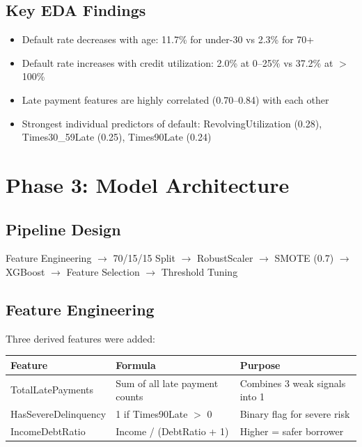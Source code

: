 \documentclass[12pt, a4paper]{article}
\begin{document}
\subsection{Key EDA Findings}

\begin{itemize}[noitemsep]
    \item Default rate decreases with age: 11.7\% for under-30 vs 2.3\% for 70+
    \item Default rate increases with credit utilization: 2.0\% at 0--25\% vs 37.2\% at $>$100\%
    \item Late payment features are highly correlated (0.70--0.84) with each other
    \item Strongest individual predictors of default: RevolvingUtilization (0.28), Times30\_59Late (0.25), Times90Late (0.24)
\end{itemize}




\section{Phase 3: Model Architecture}

\subsection{Pipeline Design}

Feature Engineering $\rightarrow$ 70/15/15 Split $\rightarrow$ RobustScaler $\rightarrow$ SMOTE (0.7) $\rightarrow$ XGBoost $\rightarrow$ Feature Selection $\rightarrow$ Threshold Tuning

\subsection{Feature Engineering}

Three derived features were added:

\begin{table}[H]
\centering
\begin{tabular}{lll}
\toprule
\textbf{Feature} & \textbf{Formula} & \textbf{Purpose} \\
\midrule
TotalLatePayments & Sum of all late payment counts & Combines 3 weak signals into 1 \\
HasSevereDelinquency & 1 if Times90Late $>$ 0 & Binary flag for severe risk \\
IncomeDebtRatio & Income / (DebtRatio + 1) & Higher = safer borrower \\
\bottomrule
\end{tabular}
\end{table}
\end{document}
